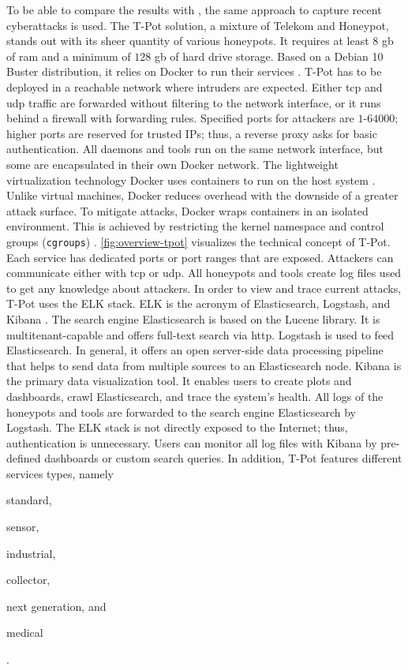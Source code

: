 To be able to compare the results with \citet{Kelly2021}, the same approach to capture recent cyberattacks is used.
The T-Pot solution, a mixture of Telekom and Honeypot, stands out with its sheer quantity of various honeypots.
It requires at least $8$ \ac{gb} of \ac{ram} and a minimum of $128$ \ac{gb} of hard drive storage.
Based on a Debian 10 Buster distribution, it relies on Docker to run their services \cite{docker2021}.
T-Pot has to be deployed in a reachable network where intruders are expected.
Either \ac{tcp} and \ac{udp} traffic are forwarded without filtering to the network interface, or it runs behind a firewall with forwarding rules.
Specified ports for attackers are $1$-$64000$; higher ports are reserved for trusted IPs; thus, a reverse proxy asks for basic authentication.
All daemons and tools run on the same network interface, but some are encapsulated in their own Docker network.
The lightweight virtualization technology Docker uses containers to run on the host system \cite{combe2016}.
Unlike virtual machines, Docker reduces overhead with the downside of a greater attack surface.
To mitigate attacks, Docker wraps containers in an isolated environment.
This is achieved by restricting the kernel namespace and control groups (\verb|cgroups|) \cite{combe2016}.
\autoref{fig:overview-tpot} visualizes the technical concept of T-Pot.
Each service has dedicated ports or port ranges that are exposed.
Attackers can communicate either with \ac{tcp} or \ac{udp}.
All honeypots and tools create log files used to get any knowledge about attackers.
In order to view and trace current attacks, T-Pot uses the ELK stack.
ELK is the acronym of Elasticsearch, Logstash, and Kibana \cite{elastic2021}.
The search engine Elasticsearch is based on the Lucene library.
It is multitenant-capable and offers full-text search via \ac{http}.
Logstash is used to feed Elasticsearch.
In general, it offers an open server-side data processing pipeline that helps to send data from multiple sources to an Elasticsearch node.
Kibana is the primary data visualization tool.
It enables users to create plots and dashboards, crawl Elasticsearch, and trace the system's health.
All logs of the honeypots and tools are forwarded to the search engine Elasticsearch by Logstash.
The ELK stack is not directly exposed to the Internet; thus, authentication is unnecessary.
Users can monitor all log files with Kibana by pre-defined dashboards or custom search queries.
In addition, T-Pot features different services types, namely
\begin{enumerate*}[label=(\roman*)]
    \item standard,
    \item sensor,
    \item industrial,
    \item collector,
    \item next generation, and
    \item medical
\end{enumerate*}.
